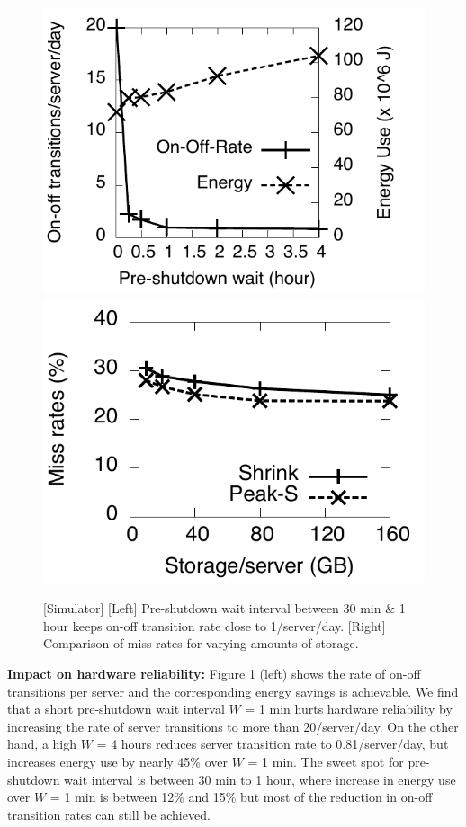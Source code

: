 \begin{figure}
\centering
\includegraphics[scale=0.4]{graphs/final/onoff.pdf}
\includegraphics[scale=0.4]{graphs/final/storage.pdf}
\caption{[Simulator] [Left] Pre-shutdown wait interval between 30 min \& 1 hour keeps on-off transition rate close to 1/server/day. [Right] Comparison of miss rates for varying amounts of storage.}
\label{fig:sim-onoffrate}
\end{figure}
\textbf{Impact on hardware reliability:} Figure \ref{fig:sim-onoffrate} (left) shows the rate of on-off transitions per server and the corresponding energy savings is achievable. We find that a short pre-shutdown wait interval $W$ = 1 min hurts hardware reliability by increasing the rate of server transitions to more than 20/server/day. On the other hand, a  high $W$ = 4 hours reduces server transition rate to 0.81/server/day, but increases energy use by nearly 45\% over $W$ = 1 min.  The sweet spot for pre-shutdown wait interval is between 30 min to 1 hour, where increase in energy use over $W$ = 1 min is between 12\% and 15\%  but most of the reduction in on-off transition rates can still be achieved.

